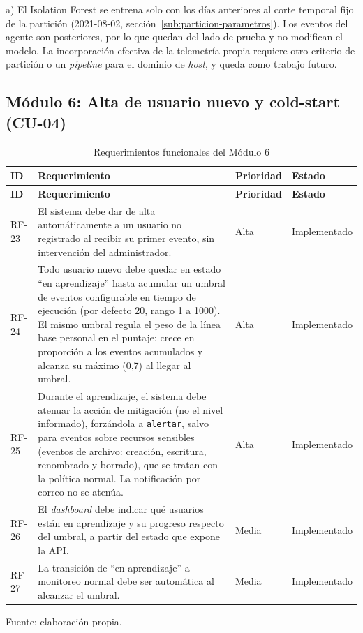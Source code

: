 \begin{notastabla}
\noindent a) El Isolation Forest se entrena solo con los días anteriores al corte temporal fijo de la partición (2021-08-02, sección~\ref{sub:particion-parametros}). Los eventos del agente son posteriores, por lo que quedan del lado de prueba y no modifican el modelo. La incorporación efectiva de la telemetría propia requiere otro criterio de partición o un \emph{pipeline} para el dominio de \emph{host}, y queda como trabajo futuro.
\end{notastabla}


\subsection{Módulo 6: Alta de usuario nuevo y cold-start (CU-04)}
\begin{tablacompacta}
\begin{longtable}{P{1.1cm}P{9.3cm}C{1.6cm}P{2.6cm}}
	\caption{Requerimientos funcionales del Módulo 6}
	\label{tab:rf-modulo6}\\
	\hline
	\textbf{ID} & \textbf{Requerimiento} & \textbf{Prioridad} & \textbf{Estado} \\
	\hline
	\endfirsthead
	\hline
	\textbf{ID} & \textbf{Requerimiento} & \textbf{Prioridad} & \textbf{Estado} \\
	\hline
	\endhead
	RF-23 & El sistema debe dar de alta automáticamente a un usuario no registrado al recibir su primer evento, sin intervención del administrador. & Alta & Implementado \\
	\hline
	RF-24 & Todo usuario nuevo debe quedar en estado ``en aprendizaje'' hasta acumular un umbral de eventos configurable en tiempo de ejecución (por defecto 20, rango 1 a 1000). El mismo umbral regula el peso de la línea base personal en el puntaje: crece en proporción a los eventos acumulados y alcanza su máximo (0,7) al llegar al umbral. & Alta & Implementado \\
	\hline
	RF-25 & Durante el aprendizaje, el sistema debe atenuar la acción de mitigación (no el nivel informado), forzándola a \texttt{alertar}, salvo para eventos sobre recursos sensibles (eventos de archivo: creación, escritura, renombrado y borrado), que se tratan con la política normal. La notificación por correo no se atenúa. & Alta & Implementado \\
	\hline
	RF-26 & El \emph{dashboard} debe indicar qué usuarios están en aprendizaje y su progreso respecto del umbral, a partir del estado que expone la API. & Media & Implementado \\
	\hline
	RF-27 & La transición de ``en aprendizaje'' a monitoreo normal debe ser automática al alcanzar el umbral. & Media & Implementado \\
	\hline
\end{longtable}
{\small Fuente: elaboración propia.\par}
\end{tablacompacta}


